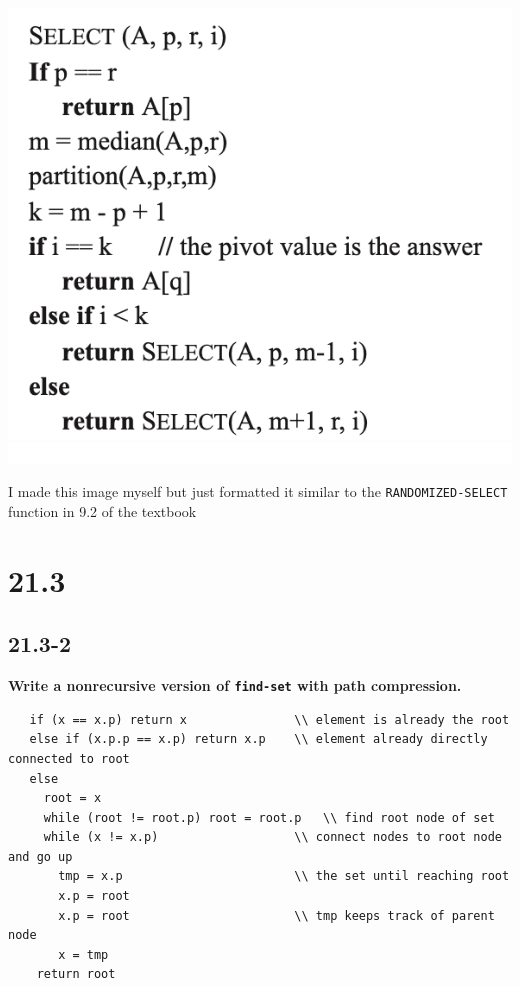 \documentclass[11pt]{article}
\begin{document}
\includegraphics[scale=0.9]{select.png}

I made this image myself but just formatted it similar to the \texttt{RANDOMIZED-SELECT} function in 
9.2 of the textbook
 \newpage

 \section*{21.3}
 \subsection*{21.3-2}
 \textbf{Write a nonrecursive version of \texttt{find-set} with path compression.}
 \begin{verbatim}
   if (x == x.p) return x               \\ element is already the root
   else if (x.p.p == x.p) return x.p    \\ element already directly connected to root
   else 
     root = x
     while (root != root.p) root = root.p   \\ find root node of set
     while (x != x.p)                   \\ connect nodes to root node and go up
       tmp = x.p                        \\ the set until reaching root
       x.p = root 
       x.p = root                       \\ tmp keeps track of parent node
       x = tmp 
    return root
 \end{verbatim}
\end{document}
